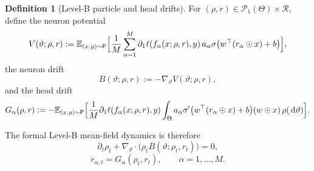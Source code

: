 \documentclass[11pt]{article}
\theoremstyle{definition}
\newtheorem{definition}[theorem]{Definition}
\newcommand{\E}{\mathbb{E}}
\newcommand{\PP}{\mathcal{P}}
\newcommand{\dd}{\,\mathrm{d}}
\begin{document}
\begin{definition}[Level-B particle and head drifts]
For $(\rho,r)\in \PP_1(\Theta)\times \mathcal R$, define the neuron potential
\begin{equation}
  V(\vartheta;\rho,r)
  :=
  \E_{(x,y)\sim\mathsf P}
  \Bigl[
    \frac1M\sum_{\alpha=1}^M
    \partial_1\ell(f_\alpha(x;\rho,r),y)\,
    a_\alpha \sigma\bigl(w^\top(r_\alpha\odot x)+b\bigr)
  \Bigr],
  \label{eq:levelb-potential}
\end{equation}
the neuron drift
\begin{equation}
  B(\vartheta;\rho,r):=-\nabla_\vartheta V(\vartheta;\rho,r),
  \label{eq:levelb-neuron-drift}
\end{equation}
and the head drift
\begin{equation}
  G_\alpha(\rho,r)
  :=
  -\E_{(x,y)\sim\mathsf P}
  \Bigl[
    \frac1M
    \partial_1\ell(f_\alpha(x;\rho,r),y)
    \int_\Theta
    a_\alpha \sigma'\bigl(w^\top(r_\alpha\odot x)+b\bigr)
    (w\odot x)
    \,\rho(\dd \vartheta)
  \Bigr].
  \label{eq:levelb-head-drift}
\end{equation}
\end{definition}

The formal Level-B mean-field dynamics is therefore
\begin{equation}
  \partial_t \rho_t
  +
  \nabla_\vartheta\cdot\bigl(\rho_t B(\vartheta;\rho_t,r_t)\bigr)
  =
  0,
  \label{eq:levelb-pde}
\end{equation}
\begin{equation}
  \dot r_{\alpha,t}=G_\alpha(\rho_t,r_t),
  \qquad
  \alpha=1,\dots,M.
  \label{eq:levelb-ode}
\end{equation}
\end{document}
